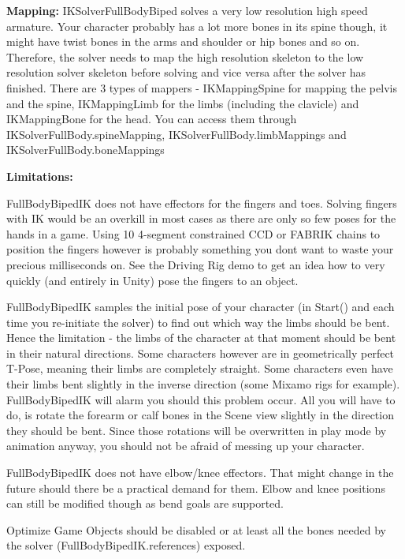 {\bfseries Mapping\+:} I\+K\+Solver\+Full\+Body\+Biped solves a very low resolution high speed armature. Your character probably has a lot more bones in it\textquotesingle{}s spine though, it might have twist bones in the arms and shoulder or hip bones and so on. Therefore, the solver needs to map the high resolution skeleton to the low resolution solver skeleton before solving and vice versa after the solver has finished. There are 3 types of mappers -\/ I\+K\+Mapping\+Spine for mapping the pelvis and the spine, I\+K\+Mapping\+Limb for the limbs (including the clavicle) and I\+K\+Mapping\+Bone for the head. You can access them through I\+K\+Solver\+Full\+Body.\+spine\+Mapping, I\+K\+Solver\+Full\+Body.\+limb\+Mappings and I\+K\+Solver\+Full\+Body.\+bone\+Mappings

 {\bfseries Limitations\+:}
\begin{DoxyItemize}
\item Full\+Body\+Biped\+IK does not have effectors for the fingers and toes. Solving fingers with IK would be an overkill in most cases as there are only so few poses for the hands in a game. Using 10 4-\/segment constrained C\+CD or F\+A\+B\+R\+IK chains to position the fingers however is probably something you don\textquotesingle{}t want to waste your precious milliseconds on. See the Driving Rig demo to get an idea how to very quickly (and entirely in Unity) pose the fingers to an object.
\item Full\+Body\+Biped\+IK samples the initial pose of your character (in Start() and each time you re-\/initiate the solver) to find out which way the limbs should be bent. Hence the limitation -\/ the limbs of the character at that moment should be bent in their natural directions. Some characters however are in geometrically perfect T-\/\+Pose, meaning their limbs are completely straight. Some characters even have their limbs bent slightly in the inverse direction (some Mixamo rigs for example). Full\+Body\+Biped\+IK will alarm you should this problem occur. All you will have to do, is rotate the forearm or calf bones in the Scene view slightly in the direction they should be bent. Since those rotations will be overwritten in play mode by animation anyway, you should not be afraid of messing up your character.
\item Full\+Body\+Biped\+IK does not have elbow/knee effectors. That might change in the future should there be a practical demand for them. Elbow and knee positions can still be modified though as bend goals are supported.
\item Optimize Game Objects should be disabled or at least all the bones needed by the solver (Full\+Body\+Biped\+I\+K.\+references) exposed.

\end{DoxyItemize}
